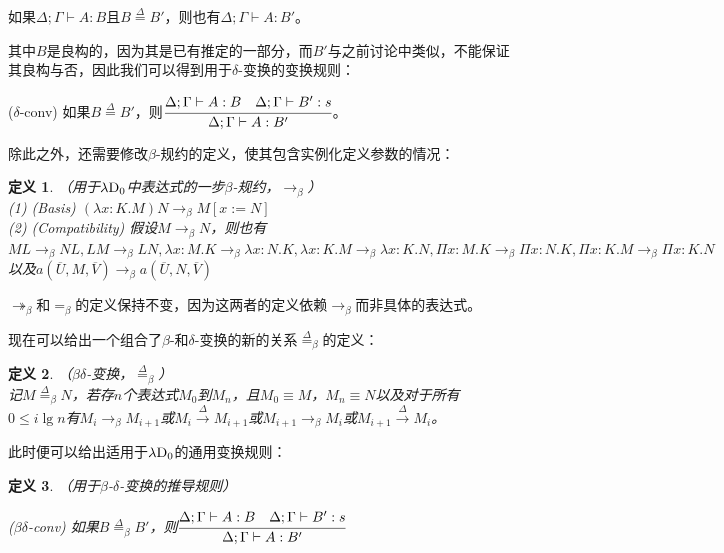 \documentclass[UTF8]{article}
\newtheorem{thm}{定义}[section]
\begin{document}
		如果$\Delta;\Gamma\vdash A:B$且$B\stackrel{\Delta}{=}B'$，则也有$\Delta;\Gamma\vdash A:B'$。
		
		其中$B$是良构的，因为其是已有推定的一部分，而$B'$与之前讨论中类似，不能保证其良构与否，因此我们可以得到用于$\delta$-变换的变换规则：
		
		($\delta$-conv) 如果$B\stackrel{\Delta}{=}B'$，则$\cfrac{\Delta;\Gamma\vdash A:B\ \ \ \Delta;\Gamma\vdash B':s}{\Delta;\Gamma\vdash A:B'}$。
		
		除此之外，还需要修改$\beta$-规约的定义，使其包含实例化定义参数的情况：
		
		\begin{thm}（用于$\lambda{\rm D_0}$中表达式的一步$\beta$-规约，$\rightarrow_\beta$）\\
			(1) (Basis) $(\lambda x:K.M)N\rightarrow_\beta M\left[x:=N\right]$\\
			(2) (Compatibility) 假设$M\rightarrow_\beta N$，则也有$ML\rightarrow_\beta NL,LM\rightarrow_\beta LN,\lambda x:M.K\rightarrow_\beta\lambda x:N.K,\lambda x:K.M\rightarrow_\beta\lambda x:K.N,\Pi x:M.K\rightarrow_\beta\Pi x:N.K,\Pi x:K.M\rightarrow_\beta\Pi x:K.N$以及$a(\overline{U},M,\overline{V})\rightarrow_\beta a(\overline{U},N,\overline{V})$ 
		\end{thm}
	
		$\twoheadrightarrow_\beta$和$=_\beta$的定义保持不变，因为这两者的定义依赖$\rightarrow_\beta$而非具体的表达式。
		
		现在可以给出一个组合了$\beta$-和$\delta$-变换的新的关系$\stackrel{\Delta}{=}_\beta$的定义：
		
		\begin{thm}（$\beta\delta$-变换，$\stackrel{\Delta}{=}_\beta$）\\
			记$M\stackrel{\Delta}{=}_\beta N$，若存$n$个表达式$M_0$到$M_n$，且$M_0\equiv M$，$M_n\equiv N$以及对于所有$0\le i\lg n$有$M_i\rightarrow_\beta M_{i+1}$或$M_i\stackrel{\Delta}{\rightarrow}M_{i+1}$或$M_{i+1}\rightarrow_\beta M_i$或$M_{i+1}\stackrel{\Delta}{\rightarrow}M_i$。
		\end{thm}
	
		此时便可以给出适用于$\lambda{\rm D_0}$的通用变换规则：
		
		\begin{thm}（用于$\beta$-$\delta$-变换的推导规则）
			
			($\beta\delta$-conv) 如果$B\stackrel{\Delta}{=}_\beta B'$，则$\cfrac{\Delta;\Gamma\vdash A:B\ \ \ \Delta;\Gamma\vdash B':s}{\Delta;\Gamma\vdash A:B'}$
		\end{thm}
\end{document}
